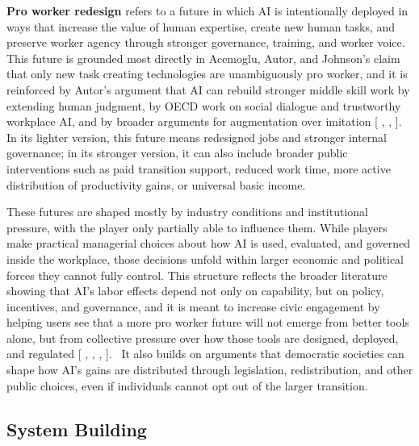 \documentclass[sigconf,authordraft]{acmart}
\begin{document}
\textbf{Pro worker redesign} refers to a future in which AI is intentionally deployed in ways that increase the value of human expertise, create new human tasks, and preserve worker agency through stronger governance, training, and worker voice. This future is grounded most directly in Acemoglu, Autor, and Johnson’s claim that only new task creating technologies are unambiguously pro worker, and it is reinforced by Autor’s argument that AI can rebuild stronger middle skill work by extending human judgment, by OECD work on social dialogue and trustworthy workplace AI, and by broader arguments for augmentation over imitation [\cite{acemoglu2026building} ,  \cite{autor2024applying} ,  \cite{oecd2023employment}]. In its lighter version, this future means redesigned jobs and stronger internal governance; in its stronger version, it can also include broader public interventions such as paid transition support, reduced work time, more active distribution of productivity gains, or universal basic income.

These futures are shaped mostly by industry conditions and institutional pressure, with the player only partially able to influence them. While players make practical managerial choices about how AI is used, evaluated, and governed inside the workplace, those decisions unfold within larger economic and political forces they cannot fully control. This structure reflects the broader literature showing that AI’s labor effects depend not only on capability, but on policy, incentives, and governance, and it is meant to increase civic engagement by helping users see that a more pro worker future will not emerge from better tools alone, but from collective pressure over how those tools are designed, deployed, and regulated [\cite{acemoglu2026building} ,  \cite{acemoglu2019automation} , \cite{acemoglu2022tasks} ,  \cite{oecd2023employment}].  It also builds on arguments that democratic societies can shape how AI’s gains are distributed through legislation, redistribution, and other public choices, even if individuals cannot opt out of the larger transition.


\subsection{System Building}
\end{document}
